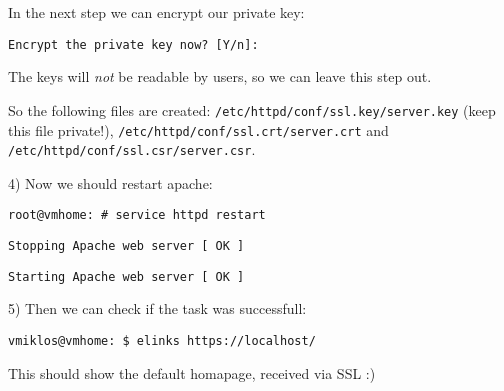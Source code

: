 In the next step we can encrypt our private key:

{\tt Encrypt the private key now? [Y/n]:}

The keys will \textit{not} be readable by users, so we can leave this step out.

So the following files are created: {\tt /etc/httpd/conf/ssl.key/server.key} (keep this file private!), {\tt /etc/httpd/conf/ssl.crt/server.crt} and {\tt /etc/httpd/conf/ssl.csr/server.csr}.

4) Now we should restart apache:

{\tt root@vmhome:~# service httpd restart}

{\tt Stopping Apache web server [  OK  ]}

{\tt Starting Apache web server [  OK  ]}

5) Then we can check if the task was successfull:

{\tt vmiklos@vmhome:~\$ elinks https://localhost/}

This should show the default homapage, received via SSL :)
